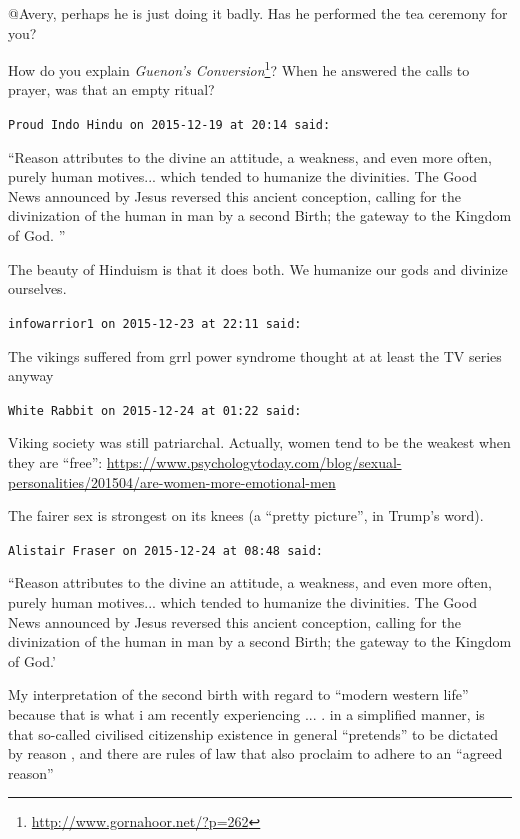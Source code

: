 \begin{footnotesize}
\begin{sffamily}
@Avery, perhaps he is just doing it badly. Has he performed the tea ceremony for you?

How do you explain \textit{Guenon's Conversion}\footnote{\url{http://www.gornahoor.net/?p=262}}? When he answered the calls to prayer, was that an empty ritual?

\hfill

\texttt{Proud Indo Hindu on 2015-12-19 at 20:14 said:}

``Reason attributes to the divine an attitude, a weakness, and even more often, purely human motives... which tended to humanize the divinities. The Good News announced by Jesus reversed this ancient conception, calling for the divinization of the human in man by a second Birth; the gateway to the Kingdom of God. ''

The beauty of Hinduism is that it does both. We humanize our gods and divinize ourselves.

\hfill

\texttt{infowarrior1 on 2015-12-23 at 22:11 said:}

The vikings suffered from grrl power syndrome thought at at least the TV series anyway

\hfill

\texttt{White Rabbit on 2015-12-24 at 01:22 said:}

Viking society was still patriarchal. Actually, women tend to be the weakest when they are ``free'':
\url{https://www.psychologytoday.com/blog/sexual-personalities/201504/are-women-more-emotional-men}


The fairer sex is strongest on its knees (a ``pretty picture'', in Trump's word).

\hfill

\texttt{Alistair Fraser on 2015-12-24 at 08:48 said:}

``Reason attributes to the divine an attitude, a weakness, and even more often, purely human motives... which tended to humanize the divinities. The Good News announced by Jesus reversed this ancient conception, calling for the divinization of the human in man by a second Birth; the gateway to the Kingdom of God.'

My interpretation of the second birth with regard to ``modern western life'' because that is what i am recently experiencing ... . in a simplified manner, is that so-called civilised citizenship existence in general ``pretends'' to be dictated by reason , and there are rules of law that also proclaim to adhere to an ``agreed reason''


\end{sffamily}
\end{footnotesize}
